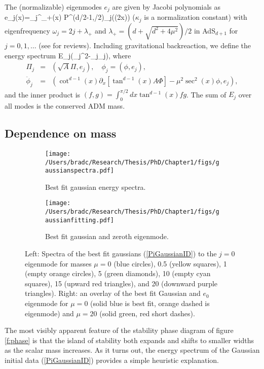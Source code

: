\documentclass[../PhD.tex]{subfiles}
\begin{document}
The (normalizable) eigenmodes $e_j$ are given by Jacobi polynomials as
 e_j(x)=\kappa_j\cos^{\lambda_+}(x) P^{(d/2-1,/2)}_j(\cos(2x))
\eeq
($\kappa_j$ is a normalization constant)
with eigenfrequency $\omega_j=2j+\lambda_+$ and
$\lambda_+=(d+\sqrt{d^2+4\mu^2})/2$ in AdS$_{d+1}$ for $j=0,1,\ldots$
(see \cite{hep-th/9905111,Nastase:2015wjb} for reviews).
Including gravitational backreaction, we define the energy spectrum
E_j\equiv{}\left(\Pi_j{}^2-\phi_j\ddot{\phi}_j\right),\eeq
where
\begin{eqnarray}
\Pi_j&=&\left(\sqrt{A}\Pi,e_j\right),\quad
\phi_j=\left(\phi,e_j\right),\nonumber\\
\ddot\phi_j&=&\left(\cot^{d-1}(x)\partial_x\left[\tan^{d-1}(x)A\Phi\right]
-\mu^2\sec^2(x)\phi,e_j\right),
\end{eqnarray}
and the inner product is $(f,g)=\int_0^{\pi/2}dx\tan^{d-1}(x) fg$.
The sum of $E_j$ over all modes is the conserved ADM mass.

\subsection{Dependence on mass}
\begin{figure}[!t]
\centering
\begin{subfigure}[t]{0.45\textwidth}
\texttt{[image: /Users/bradc/Research/Thesis/PhD/Chapter1/figs/gaussianspectra.pdf]}
\caption{Best fit gaussian energy spectra.} 
\label{f:gaussian}
\end{subfigure} \hfill
\begin{subfigure}[t]{0.45\textwidth}
\texttt{[image: /Users/bradc/Research/Thesis/PhD/Chapter1/figs/gaussianfitting.pdf]}
\caption{Best fit gaussian and zeroth eigenmode.}
\label{f:gaussianfits}
\end{subfigure}
\caption[Energy spectra of best fit gaussians to the $j=0$ eigenmode for various masses]{Left: Spectra of the best fit gaussians (\ref{PiGaussianID}) to 
the $j = 0$ eigenmode for masses $\mu=0$ (blue circles), 0.5 (yellow squares),
1 (empty orange circles), 5 (green diamonds), 10 (empty cyan squares), 
15 (upward red triangles), and 20 (downward purple
triangles). Right: an overlay of the best fit Gaussian and $e_0$ eigenmode 
for $\mu = 0$ (solid blue is best fit, orange dashed is eigenmode) and $\mu = 20$ (solid green, red short dashes).}
\label{f:gaussians}
\end{figure}

The most visibly apparent feature of the stability 
phase diagram of figure \ref{f:phase}
is that the island of stability both expands and shifts to smaller widths
as the scalar mass increases.  As it turns out, the energy spectrum of the
Gaussian initial data (\ref{PiGaussianID}) provides a simple heuristic
explanation.
\end{document}
